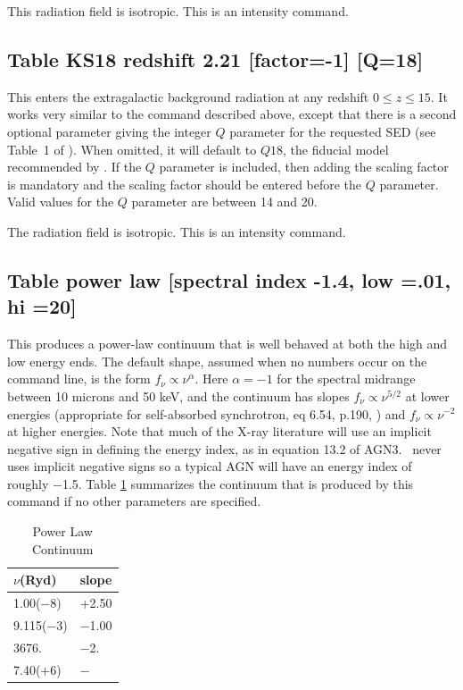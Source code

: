 This radiation field is isotropic.
This is an intensity command.

\subsection{Table KS18 redshift 2.21 [factor=-1] [Q=18]}

This enters the \citet{KhaireSrianand2019} extragalactic background radiation
at any redshift $0 \le z \le 15$. It works very similar to the
 command described above, except that there is a second
optional parameter giving the integer $Q$ parameter for the requested SED (see
Table~1 of \citealp{KhaireSrianand2019}). When omitted, it will default to
$Q18$, the fiducial model recommended by \citet{KhaireSrianand2019}. If the
$Q$ parameter is included, then adding the scaling factor is mandatory and the
scaling factor should be entered before the $Q$ parameter. Valid values for
the $Q$ parameter are between 14 and 20.

The radiation field is isotropic. This is an intensity command.

\subsection{Table power law [spectral index -1.4, low =.01, hi =20] }

This produces a power-law continuum that is well behaved at both the
high and low energy ends.
The default shape, assumed when no numbers occur
on the command line, is the form $f_\nu   \propto \nu ^\alpha  $.
Here
$\alpha = -1$ for the spectral midrange between 10 microns and 50 keV,
and the continuum has slopes $f_\nu   \propto \nu ^{5/2} $ at lower energies (appropriate for self-absorbed synchrotron, eq 6.54,
p.190, \citealp{Rybicki1979}) and
$f_\nu   \propto \nu ^{ - 2} $ at higher energies.
Note that much of the X-ray literature will use
an implicit negative sign in defining the energy index,
as in equation 13.2 of AGN3.
\Cloudy\ never uses implicit negative signs so a typical AGN will
have an energy index of roughly $-$1.5.
Table \ref{tab:PowerLawContinuum} summarizes the continuum
that is produced by this command if no other parameters are specified.

\begin{table}
\centering
\caption{Power Law Continuum}
\begin{tabular}{ll}\hline
\label{tab:PowerLawContinuum}
$\nu$(Ryd)& slope\\
\hline
1.00($-$8)& $+$2.50\\
9.115($-$3)& $-$1.00\\
3676.& $-$2.\\
7.40($+$6)& $-$\\
\hline
\end{tabular}
\end{table}

